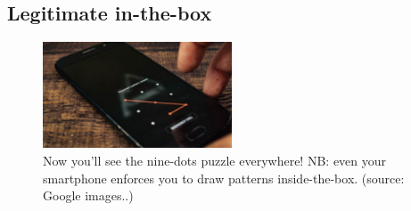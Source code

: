 \documentclass[11pt]{article}
\begin{document}
\hypertarget{appendices-in-the-box} {
	\subsection{Legitimate in-the-box}
	\label{appendices-in-the-box}
}
\begin{figure}[H]
\centering
\includegraphics[width=0.5\textwidth]{images/smartphone_nine_dots.jpg}
\caption{Now you'll see the nine-dots puzzle everywhere! NB: even your smartphone enforces you to draw patterns inside-the-box. (source: Google images..)}
\label{smartphone-nine-dots}
\end{figure}
\end{document}
